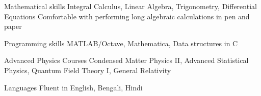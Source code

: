 

\begin{cvskills}


  
  \cvskill
	{Mathematical skills} %
	{Integral Calculus, Linear Algebra, Trigonometry, Differential Equations}
  \cvskill
	{}
	{Comfortable with performing long algebraic calculations in pen and paper} %

  \cvskill
    {Programming skills} %
    {MATLAB/Octave, Mathematica, Data structures in C} %

  \cvskill
{Advanced Physics Courses} %
{Condensed Matter Physics II, Advanced Statistical Physics, Quantum Field Theory I, General Relativity} %

  \cvskill
    {Languages} %
    {Fluent in English, Bengali, Hindi} %

\end{cvskills}
